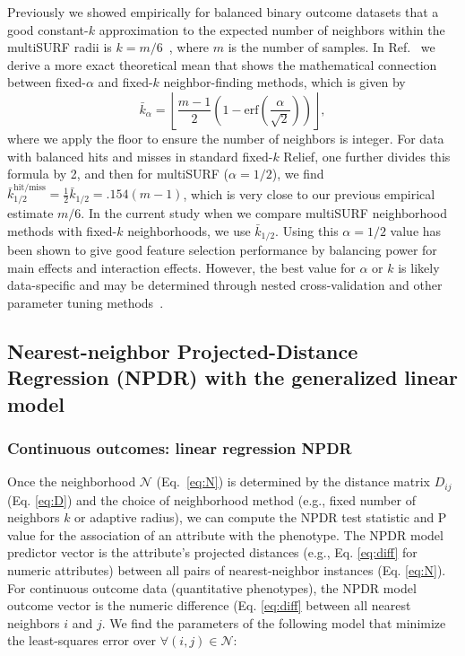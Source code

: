 \documentclass[10pt]{article}
\begin{document}
Previously we showed empirically for balanced binary outcome datasets that a good constant-$k$ approximation to the expected number of neighbors within the multiSURF radii is $k=m/6$~\cite{stir}, where $m$ is the number of samples. In Ref.~\cite{bod} we derive a more exact theoretical mean that shows the mathematical connection between fixed-$\alpha$ and fixed-$k$ neighbor-finding methods, which is given by 
\begin{equation}\label{eq:kbar}
{\bar{k}}_{\alpha} = \left \lfloor \frac{m-1}{2}  \left( 1 - \mathrm{erf}\left( \frac{\alpha}{\sqrt{2}} \right) \right) \right \rfloor,
\end{equation}
where we apply the floor to ensure the number of neighbors is integer. For data with balanced hits and misses in standard fixed-$k$ Relief, one further divides this formula by 2, and then for multiSURF ($\alpha=1/2$), we find $\bar{k}_{1/2}^{\text{hit/miss}} = \frac{1}{2}\bar{k}_{1/2} = .154 (m-1)$, which is very close to our previous empirical estimate $m/6$. In the current study when we compare multiSURF neighborhood methods with fixed-$k$ neighborhoods, we use $\bar{k}_{1/2}$. Using this $\alpha=1/2$ value has been shown to give good feature selection performance by balancing power for main effects and interaction effects. However, the best value for $\alpha$ or $k$ is likely data-specific and may be determined through nested cross-validation and other parameter tuning methods~\cite{bod}. 

\subsection{Nearest-neighbor Projected-Distance Regression (NPDR) with the generalized linear model}

\subsubsection{Continuous outcomes: linear regression NPDR}\label{sec:regress}

Once the neighborhood $\mathcal{N}$ (Eq.~\ref{eq:N}) is determined by the distance matrix $D_{ij}$ (Eq. \ref{eq:D}) and the choice of neighborhood method (e.g., fixed number of neighbors $k$ or adaptive radius), we can compute the NPDR test statistic and P value for the association of an attribute with the phenotype. The NPDR model predictor vector is the attribute's projected distances (e.g., Eq. \ref{eq:diff} for numeric attributes) between all pairs of nearest-neighbor instances (Eq. \ref{eq:N}). For continuous outcome data (quantitative phenotypes), the NPDR model outcome vector is the numeric difference (Eq. \ref{eq:diff} between all nearest neighbors $i$ and $j$. We find the parameters of the following model that minimize the least-squares error over $\forall(i,j) \in \mathcal{N}$: 
\end{document}
